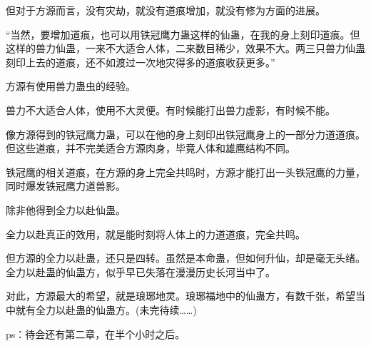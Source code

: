 \begin{this_body}
但对于方源而言，没有灾劫，就没有道痕增加，就没有修为方面的进展。

“当然，要增加道痕，也可以用铁冠鹰力蛊这样的仙蛊，在我的身上刻印道痕。但这样的兽力仙蛊，一来不大适合人体，二来数目稀少，效果不大。两三只兽力仙蛊刻印上去的道痕，还不如渡过一次地灾得多的道痕收获更多。”

方源有使用兽力蛊虫的经验。

兽力不大适合人体，使用不大灵便。有时候能打出兽力虚影，有时候不能。

像方源得到的铁冠鹰力蛊，可以在他的身上刻印出铁冠鹰身上的一部分力道道痕。但这些道痕，并不完美适合方源肉身，毕竟人体和雄鹰结构不同。

铁冠鹰的相关道痕，在方源的身上完全共鸣时，方源才能打出一头铁冠鹰的力量，同时爆发铁冠鹰力道兽影。

除非他得到全力以赴仙蛊。

全力以赴真正的效用，就是能时刻将人体上的力道道痕，完全共鸣。

但方源的全力以赴蛊，还只是四转。虽然是本命蛊，但如何升仙，却是毫无头绪。全力以赴蛊的仙蛊方，似乎早已失落在漫漫历史长河当中了。

对此，方源最大的希望，就是琅琊地灵。琅琊福地中的仙蛊方，有数千张，希望当中就有全力以赴蛊的仙蛊方。(未完待续……)

ps：待会还有第二章，在半个小时之后。

\end{this_body}

